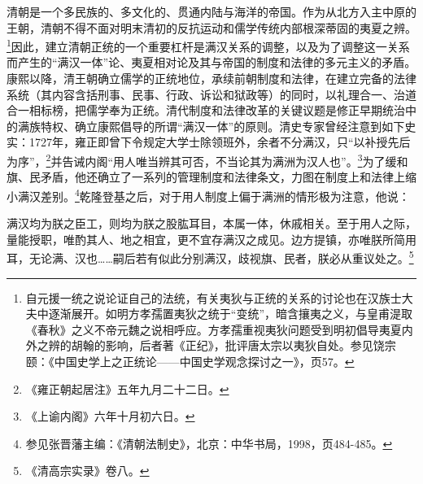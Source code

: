 \documentclass[a4paper, 12pt, openright]{ctexbook}
\renewenvironment{quote}
  {\list{}{\rightmargin2\ccwd \leftmargin2\ccwd \itemindent=2\ccwd \listparindent=2\ccwd}%
   \item\relax\small\kaishu\color{black}}
  {\endlist}
\begin{document}
清朝是一个多民族的、多文化的、贯通内陆与海洋的帝国。作为从北方入主中原的王朝，清朝不得不面对明末清初的反抗运动和儒学传统内部根深蒂固的夷夏之辨。\footnote{自元援一统之说论证自己的法统，有关夷狄与正统的关系的讨论也在汉族士大夫中逐渐展开。如明方孝孺置夷狄之统于“变统”，暗含攘夷之义，与皇甫湜取《春秋》之义不帝元魏之说相呼应。方孝孺重视夷狄问题受到明初倡导夷夏内外之辨的胡翰的影响，后者著《正纪》，批评唐太宗以夷狄自处。参见饶宗颐：《中国史学上之正统论——中国史学观念探讨之一》，页57。}因此，建立清朝正统的一个重要杠杆是满汉关系的调整，以及为了调整这一关系而产生的“满汉一体”论、夷夏相对论及其与帝国的制度和法律的多元主义的矛盾。康熙以降，清王朝确立儒学的正统地位，承续前朝制度和法律，在建立完备的法律系统（其内容含括刑事、民事、行政、诉讼和狱政等）的同时，以礼理合一、治道合一相标榜，把儒学奉为正统。清代制度和法律改革的关键议题是修正早期统治中的满族特权、确立康熙倡导的所谓“满汉一体”的原则。清史专家曾经注意到如下史实：1727年，雍正即曾下令规定大学士除领班外，余者不分满汉，只“以补授先后为序”，\footnote{《雍正朝起居注》五年九月二十二日。}并告诫内阁“用人唯当辨其可否，不当论其为满洲为汉人也”。\footnote{《上谕内阁》六年十月初六日。}为了缓和旗、民矛盾，他还确立了一系列的管理制度和法律条文，力图在制度上和法律上缩小满汉差别。\footnote{参见张晋藩主编：《清朝法制史》，北京：中华书局，1998，页484-485。}乾隆登基之后，对于用人制度上偏于满洲的情形极为注意，他说：

\begin{quote}
满汉均为朕之臣工，则均为朕之股肱耳目，本属一体，休戚相关。至于用人之际，量能授职，唯酌其人、地之相宜，更不宜存满汉之成见。边方提镇，亦唯朕所简用耳，无论满、汉也……嗣后若有似此分别满汉，歧视旗、民者，朕必从重议处之。\footnote{《清高宗实录》卷八。}
\end{quote}
\end{document}

